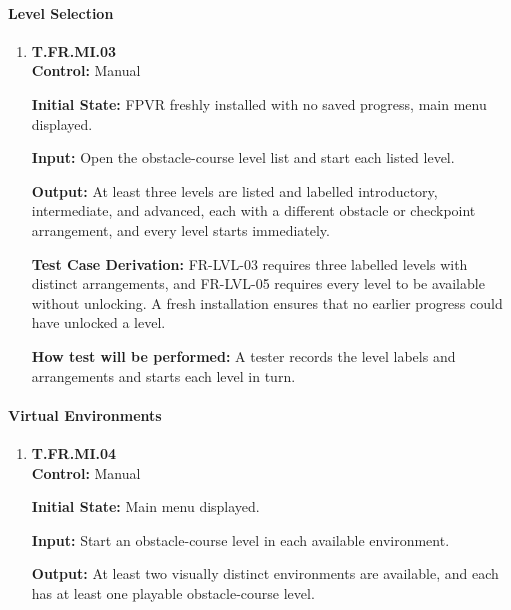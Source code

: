 \documentclass[12pt, titlepage]{article}
\begin{document}
{\begin{enumerate}
\end{enumerate}

\paragraph{Level Selection}

\begin{enumerate}

\item{\hypertarget{test-fr-mi-03}{}\textbf{T.FR.MI.03}\\}
\textbf{Control:} Manual

\textbf{Initial State:} FPVR freshly installed with no saved progress, main menu
displayed.

\textbf{Input:} Open the obstacle-course level list and start each listed level.

\textbf{Output:} At least three levels are listed and labelled introductory,
intermediate, and advanced, each with a different obstacle or checkpoint arrangement,
and every level starts immediately.

\textbf{Test Case Derivation:} \mbox{FR-LVL-03} requires three labelled levels with
distinct arrangements, and \mbox{FR-LVL-05} requires every level to be available without
unlocking. A fresh installation ensures that no earlier progress could have unlocked a
level.

\textbf{How test will be performed:} A tester records the level labels and arrangements
and starts each level in turn.

\end{enumerate}

\paragraph{Virtual Environments}

\begin{enumerate}

\item{\hypertarget{test-fr-mi-04}{}\textbf{T.FR.MI.04}\\}
\textbf{Control:} Manual

\textbf{Initial State:} Main menu displayed.

\textbf{Input:} Start an obstacle-course level in each available environment.

\textbf{Output:} At least two visually distinct environments are available, and each has
at least one playable obstacle-course level.


\end{enumerate}}
\end{document}
